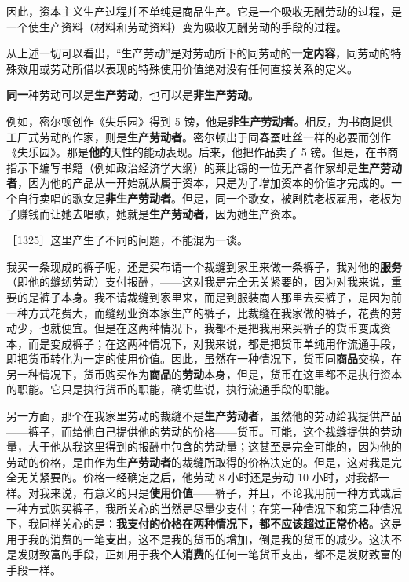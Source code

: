 因此，资本主义生产过程并不单纯是商品生产。它是一个吸收无酬劳动的过程，是一个使生产资料（材料和劳动资料）变为吸收无酬劳动的手段的过程。

从上述一切可以看出，“生产劳动”是对劳动所下的同劳动的\textbf{一定内容}，同劳动的特殊效用或劳动所借以表现的特殊使用价值绝对没有任何直接关系的定义。

\textbf{同一}种劳动可以是\textbf{生产劳动}，也可以是\textbf{非生产劳动}。

例如，密尔顿创作《失乐园》得到 5 镑，他是\textbf{非生产劳动者}。相反，为书商提供工厂式劳动的作家，则是\textbf{生产劳动者}。密尔顿出于同春蚕吐丝一样的必要而创作《失乐园》。那是\textbf{他的}天性的能动表现。后来，他把作品卖了 5 镑。但是，在书商指示下编写书籍（例如政治经济学大纲）的莱比锡的一位无产者作家却是\textbf{生产劳动者}，因为他的产品从一开始就从属于资本，只是为了增加资本的价值才完成的。一个自行卖唱的歌女是\textbf{非生产劳动者}。但是，同一个歌女，被剧院老板雇用，老板为了赚钱而让她去唱歌，她就是\textbf{生产劳动者}，因为她生产资本。


［1325］这里产生了不同的问题，不能混为一谈。

我买一条现成的裤子呢，还是买布请一个裁缝到家里来做一条裤子，我对他的\textbf{服务}（即他的缝纫劳动）支付报酬，——这对我是完全无关紧要的，因为对我来说，重要的是裤子本身。我不请裁缝到家里来，而是到服装商人那里去买裤子，是因为前一种方式花费大，而缝纫业资本家生产的裤子，比裁缝在我家做的裤子，花费的劳动少，也就便宜。但是在这两种情况下，我都不是把我用来买裤子的货币变成资本，而是变成裤子；在这两种情况下，对我来说，都是把货币单纯用作流通手段，即把货币转化为一定的使用价值。因此，虽然在一种情况下，货币同\textbf{商品}交换，在另一种情况下，货币购买作为\textbf{商品}的\textbf{劳动}本身，但是，货币在这里都不是执行资本的职能。它只是执行货币的职能，确切些说，执行流通手段的职能。

另一方面，那个在我家里劳动的裁缝不是\textbf{生产劳动者}，虽然他的劳动给我提供产品——裤子，而给他自己提供他的劳动的价格——货币。可能，这个裁缝提供的劳动量，大于他从我这里得到的报酬中包含的劳动量；这甚至是完全可能的，因为他的劳动的价格，是由作为\textbf{生产劳动者}的裁缝所取得的价格决定的。但是，这对我是完全无关紧要的。价格一经确定之后，他劳动 8 小时还是劳动 10 小时，对我都一样。对我来说，有意义的只是\textbf{使用价值}——裤子，并且，不论我用前一种方式或后一种方式购买裤子，我所关心的当然是尽量少支付；在第一种情况下和第二种情况下，我同样关心的是：\textbf{我支付的价格在两种情况下，都不应该超过正常价格}。这是用于我的消费的一笔\textbf{支出}，这不是我的货币的增加，倒是我的货币的减少。这决不是发财致富的手段，正如用于我\textbf{个人消费}的任何一笔货币支出，都不是发财致富的手段一样。

